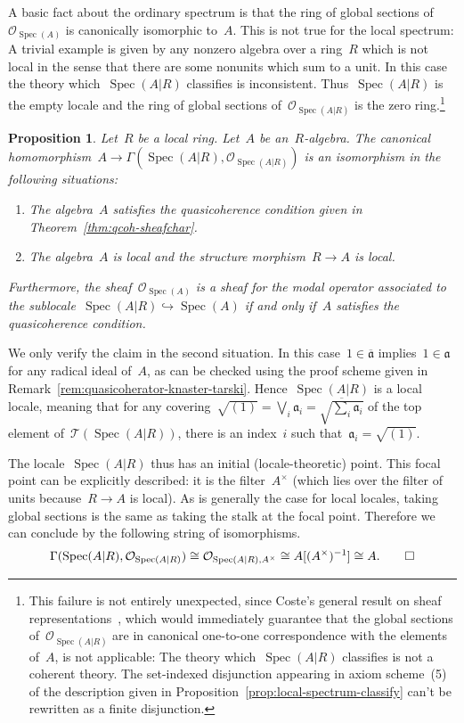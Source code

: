 \documentclass[10pt,reqno,a4paper]{amsbook}
\makeatletter
\theoremstyle{definition}
\theoremstyle{plain}
\newtheorem{prop}[defn]{Proposition}
\theoremstyle{remark}
\renewcommand{\O}{\mathcal{O}}
\newcommand{\T}{\mathcal{T}}
\newcommand{\aaa}{\mathfrak{a}}
\DeclareMathOperator{\Spec}{Spec}
\newcommand{\Open}{\T}
\newcommand{\?}{\,{:}\,}
\renewcommand{\_}{\mathpunct{.}\,}
\renewenvironment{proof}[1][\proofname]{\par
  \pushQED{\qed}%
  \normalfont \topsep6\p@\@plus6\p@\relax
  \trivlist
  \item[\hskip\labelsep
        \itshape
    #1\@addpunct{.}]\ignorespaces
}{%
  \popQED\endtrivlist\@endpefalse
}
\makeatother
\begin{document}
A basic fact about the ordinary spectrum is that the ring of global sections
of~$\O_{\Spec(A)}$ is canonically isomorphic to~$A$. This is not true for the
local spectrum: A trivial example is given by any nonzero algebra over a
ring~$R$ which is not local in the sense that there are some nonunits which sum
to a unit. In this case the theory which~$\Spec(A|R)$ classifies is
inconsistent. Thus~$\Spec(A|R)$ is the empty locale and the ring of global
sections of~$\O_{\Spec(A|R)}$ is the zero ring.\footnote{This failure is not
entirely unexpected, since Coste's general result on sheaf
representations~\cite[Theorem~5.1.1]{coste:sheaf-representation}, which would
immediately guarantee that the global sections of~$\O_{\Spec(A|R)}$ are in
canonical one-to-one correspondence with the elements of~$A$, is not
applicable: The theory which~$\Spec(A|R)$ classifies is not a coherent
theory. The set-indexed disjunction appearing in axiom scheme~(5) of the
description given in Proposition~\ref{prop:local-spectrum-classify} can't be
rewritten as a finite disjunction.}

\begin{prop}\label{prop:local-spectrum-global-functions}
Let~$R$ be a local ring. Let~$A$ be an~$R$-algebra. The canonical
homomorphism~$A \to \Gamma(\Spec(A|R), \O_{\Spec(A|R)})$ is an isomorphism in
the following situations:
\begin{enumerate}
\item The algebra~$A$ satisfies the quasicoherence condition given in
Theorem~\ref{thm:qcoh-sheafchar}.
\item The algebra~$A$ is local and the structure morphism~$R \to A$ is local.
\end{enumerate}
Furthermore, the sheaf~$\O_{\Spec(A)}$ is a sheaf
for the modal operator associated to the sublocale~$\Spec(A|R) \hookrightarrow
\Spec(A)$ if and only if~$A$ satisfies the quasicoherence condition.
\end{prop}

\begin{proof}We only verify the claim in the second situation. In this
case~$1 \in \overline{\aaa}$ implies~$1 \in \aaa$ for any radical ideal of~$A$,
as can be checked using the proof scheme given in
Remark~\ref{rem:quasicoherator-knaster-tarski}.
Hence~$\Spec(A|R)$ is a local locale, meaning that for any covering~$\sqrt{(1)}
= \bigvee_i \aaa_i = \overline{\sqrt{\sum_i \aaa_i}}$ of the top element
of~$\Open(\Spec(A|R))$, there is an index~$i$ such that~$\aaa_i = \sqrt{(1)}$.

The locale~$\Spec(A|R)$ thus has an initial (locale-theoretic) point. This
focal point can be explicitly described: it is the filter~$A^\times$ (which
lies over the filter of units because~$R \to A$ is local). As is generally the
case for local locales, taking global sections is the same as taking the stalk
at the focal point. Therefore we can conclude by the following string of
isomorphisms.
\[ \Gamma(\Spec(A|R), \O_{\Spec(A|R)}) \cong
  \O_{\Spec(A|R), A^\times} \cong
  A[(A^\times)^{-1}] \cong
  A. \qedhere \]
\end{proof}
\end{document}
